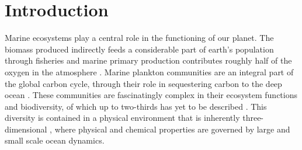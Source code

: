 \documentclass[journal abbreviation, manuscript]{copernicus}
\begin{document}
\begin{abstract} [Just collecting ideas:]





\end{abstract}



\section{Introduction}


Marine ecosystems play a central role in the functioning of our planet. The biomass produced indirectly feeds a considerable part of earth’s population through fisheries \citep{Stock2017} and marine primary production contributes roughly half of the oxygen in the atmosphere \citep{Field1998PrimaryComponents}. Marine plankton communities are an integral part of the global carbon cycle, through their role in sequestering carbon to the deep ocean \citep{Falkowski1998BiogeochemicalProduction}. These communities are fascinatingly complex in their ecosystem functions and biodiversity, of which up to two-thirds has yet to be described \citep{Appeltans2012TheDiversity}. This diversity is contained in a physical environment that is inherently three-dimensional \citep{Levin2017AddingConservation}, where physical and chemical properties are governed by large and small scale ocean dynamics. 
\end{document}
